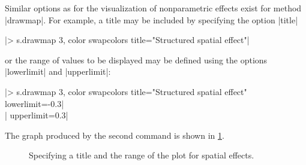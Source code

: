 Similar options as for the visualization of nonparametric effects exist for method |drawmap|. For example, a title may be
included by specifying the option |title|

|> s.drawmap 3, color swapcolors title="Structured spatial effect"|

or the range of values to be displayed may be defined using the options |lowerlimit| and |upperlimit|:

|> s.drawmap 3, color swapcolors title="Structured spatial effect" lowerlimit=-0.3|\\
|  upperlimit=0.3|

The graph produced by the second command is shown in \ref{step:spat4}.

\begin{figure}[ht]
\begin{center}
{\it\caption{Specifying a title and the range of the plot for
spatial effects.\label{step:spat4}}}
\end{center}
\end{figure}

